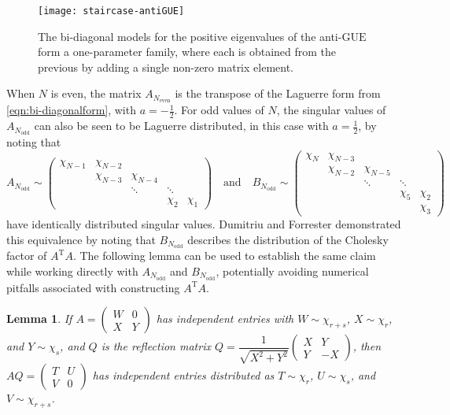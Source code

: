 \documentclass[pdftex, oneside, 10pt, letterpaper]{amsart}
\theoremstyle{plain}
\newtheorem{lemma}{Lemma}
\theoremstyle{definition}
\theoremstyle{remark}
\begin{document}
\begin{figure}
\hspace*{\fill}\texttt{[image: staircase-antiGUE]}\hspace{\fill}\mbox{}
\caption{The bi-diagonal models for the positive eigenvalues of the
  anti-{\ensuremath{\mathrm{GUE}}}{} form a one-parameter family, where each is obtained from
  the previous by adding a single non-zero matrix
  element.}\label{fig:antiGUEstaircase}
\end{figure}

When $N$ is even, the matrix $A_{N_\text{even}}$ is the transpose of
the Laguerre form from \eqref{eqn:bi-diagonalform}, with $a=-\frac12$.
For odd values of $N$, the singular values of $A_{N_\text{odd}}$ can
also be seen to be Laguerre distributed, in this case with
$a=\frac12$, by noting that
\[
A_{N_{\text{odd}}}\sim\begin{pmatrix} \chi_{N-1} & \chi_{N-2} \\ &
  \chi_{N-3} & \chi_{N-4} \\ & & \ddots & \ddots \\ & & & \chi_{2} &
  \chi_{1}
\end{pmatrix}
\quad\text{and}\quad B_{N_\text{odd}}\sim\begin{pmatrix}
  \chi_{N} & \chi_{N-3} \\
  & \chi_{N-2} & \chi_{N-5} \\
  & & \ddots & \ddots \\
  &&& \chi_5 & \chi_2 \\
  &&& & \chi_3
\end{pmatrix}
\]
have identically distributed singular values.  Dumitriu and Forrester
\cite[Claim~6.5]{DuFo} demonstrated this equivalence by noting that
$B_{N_\text{odd}}$ describes the distribution of the Cholesky factor
of $A^\mathrm{T}A$.  The following lemma can be used to establish the
same claim while working directly with $A_{N_\text{odd}}$ and
$B_{N_\text{odd}}$, potentially avoiding numerical pitfalls
associated with constructing $A^\mathrm{T}A$.

\begin{lemma}\label{lem:chilem}
  If $A=\begin{pmatrix}W&0\\X&Y\end{pmatrix}$ has independent entries
  with $W\sim\chi_{r+s}$, $X\sim\chi_r$, and $Y\sim\chi_s$, and $Q$ is
  the reflection matrix
  $Q=\dfrac{1}{\sqrt{X^2+Y^2}}\begin{pmatrix}X&Y\\Y&-X\end{pmatrix}$,
  then $AQ=\begin{pmatrix}T&U\\V&0\end{pmatrix}$ has independent
  entries distributed as $T\sim\chi_r$, $U\sim\chi_s$, and
  $V\sim\chi_{r+s}$.
\end{lemma}
\end{document}
